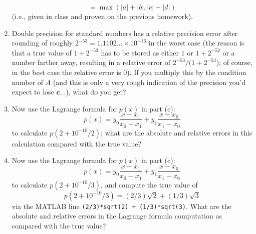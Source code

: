 \documentclass{article}
\begin{document}
\begin{enumerate}
\[			= \max(|a| + |b|, |c| + |d|)
		\]
		(i.e., given in class and proven on the previous homework).
	\item Double precision for standard numbers has a relative precision error
		after rounding of roughly $2^{-53} = 1.1102\dots\times 10^{-16}$
		in the worst case (the reason is that a true value of $1 + 2^{-53}$
		has to be stored as either $1$ or $1 + 2^{-52}$ or a number farther away,
		resulting in a relative error of $2^{-53}/(1+2^{-53}$);
		of course, in the best case the relative error is $0$).
		If you multiply this by the condition number of $A$
		(and this is only a very rough indication of the precision
		you'd expect to lose $\mathbf{c}$...),
		what do you get?
	\item Now use the Lagrange formula for $p(x)$ in part (c):
		\[
			p(x) = y_0 \frac{x-x_1}{x_0-x_1} + y_1\frac{x - x_0}{x_1-x_0}
		\]
		to calculate $p(2 + 10^{-10}/2)$;
		what are the absolute and relative errors in this calculation
		compared with the true value?
	\item Now use the Lagrange formula for $p(x)$ in part (c):
		\[
			p(x) = y_0\frac{x-x_1}{x_0 - x_1} + y_1\frac{x-x_0}{x_1-x_0}
		\]
		to calculate $p(2+10^{-10}/3)$, and compute the true value of
		\[
			p(2+10^{-10}/3) = (2/3)\sqrt{2} + (1/3)\sqrt{3}
		\]
		via the MATLAB line \verb|(2/3)*sqrt(2) + (1/3)*sqrt(3)|.
		What are the absolute and relative errors in the Lagrange formula
		computation as compared with the true value?
\end{enumerate}
\end{document}
